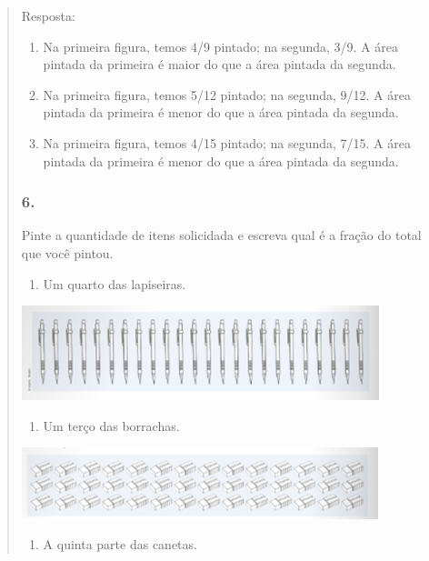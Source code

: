 \begin{mdframed}[linewidth=2pt,linecolor=salmao,roundcorner=2pt]
\begin{itemize}
{\begin{itemize}
\begin{escolha}
{\begin{quote}
{\begin{escolha}
{{{{Resposta:

\begin{enumerate}
\item
  Na primeira figura, temos 4/9 pintado; na segunda, 3/9. A
  área pintada da primeira é maior do que a área pintada da segunda.
\item
  Na primeira figura, temos 5/12 pintado; na segunda, 9/12. A área pintada da primeira é menor do que a área pintada da segunda.
\item
  Na primeira figura, temos 4/15 pintado; na segunda, 7/15. A área pintada da primeira é menor do que a área pintada da segunda.
\end{enumerate}

\subsubsection{6. }

Pinte a quantidade de itens solicidada e
escreva qual é a fração do total que você pintou.

\begin{enumerate}
\item
  Um quarto das lapiseiras.
\end{enumerate}

\includegraphics[width=4.09202in,height=1.08343in]{media/image111.png}


\begin{enumerate}
\item
  Um terço das borrachas.
\end{enumerate}

\includegraphics[width=4.08369in,height=0.81674in]{media/image112.png}


\begin{enumerate}
\item
  A quinta parte das canetas.
\end{enumerate}

}}}}
\end{escolha}}
\end{quote}}
\end{escolha}
\end{itemize}}
\end{itemize}
\end{mdframed}
